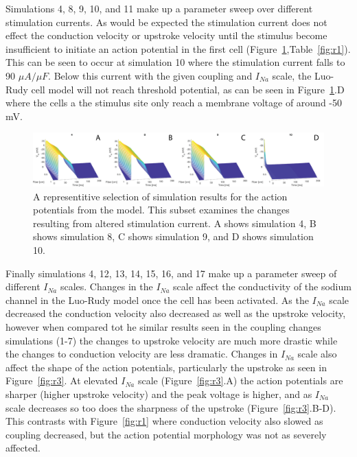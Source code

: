 \documentclass[12pt]{article}
\begin{document}
Simulations 4, 8, 9, 10, and 11 make up a parameter sweep over different stimulation currents. As would be expected the stimulation current does not effect the conduction velocity or upstroke velocity until the stimulus become insufficient to initiate an action potential in the first cell (Figure~\ref{fig:r2},Table~\ref{fig:r1}). This can be seen to occur at simulation 10 where the stimulation current falls to 90 $\mu A/\mu F$. Below this current with the given coupling and $I_{Na}$ scale, the Luo-Rudy cell model will not reach threshold potential, as can be seen in Figure~\ref{fig:r2}.D where the cells a the stimulus site only reach a membrane voltage of around -50 mV.

\begin{figure}[H]
	\centering
	\includegraphics[width=\textwidth]{Figures/Fig2.png}
	\caption{A representitive selection of simulation results for the action potentials from the model. This subset examines the changes resulting from altered stimulation current. A shows simulation 4, B shows simulation 8, C shows simulation 9, and D shows simulation 10.}
	\label{fig:r2}
\end{figure}

Finally simulations 4, 12, 13, 14, 15, 16, and 17 make up a parameter sweep of different $I_{Na}$ scales. Changes in the $I_{Na}$ scale affect the conductivity of the sodium channel in the Luo-Rudy model once the cell has been activated. As the $I_{Na}$ scale decreased the conduction velocity also decreased as well as the upstroke velocity, however when compared tot he similar results seen in the coupling changes simulations (1-7) the changes to upstroke velocity are much more drastic while the changes to conduction velocity are less dramatic. Changes in $I_{Na}$ scale also affect the shape of the action potentials, particularly the upstroke as seen in Figure~\ref{fig:r3}. At elevated $I_{Na}$ scale (Figure~\ref{fig:r3}.A) the action potentials are sharper (higher upstroke velocity) and the peak voltage is higher, and as $I_{Na}$ scale decreases so too does the sharpness of the upstroke (Figure~\ref{fig:r3}.B-D). This contrasts with Figure~\ref{fig:r1} where conduction velocity also slowed as coupling decreased, but the action potential morphology was not as severely affected.
\end{document}
